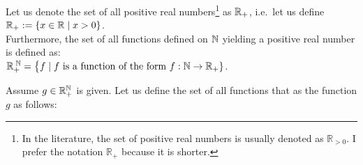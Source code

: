 Let us denote the set of all positive real numbers\footnote{
  In the literature, the set of positive real numbers is usually denoted as $\mathbb{R}_{>0}$.  I prefer the
  notation $\mathbb{R_+}$ because it is shorter.
}
as ${\mathbb R}_+$, i.e.~let us define 
\\[0.2cm]
\hspace*{1.3cm}
${\mathbb R}_+ := \{ x \in {\mathbb R} \mid x > 0 \}$. 
\\[0.2cm]
Furthermore, the set of all functions defined on  ${\mathbb N}$ yielding a positive real number is defined
as: 
\\[0.2cm]
\hspace*{1.3cm} 
${\mathbb R}_+^{\;{\mathbb N}} = \bigl\{ f \mid \mbox{$f$ is a function of the form $f: {\mathbb N} \rightarrow {\mathbb R}_+$} \}$.

\begin{Definition}[$\Oh(g)$] 
Assume $g \in {\mathbb R}_+^{{\mathbb N}}$ is given.   Let us define the set of all functions that 
  as the function $g$ as follows:
  \\[0.2cm]
  \hspace*{0.5cm} 
  \colorbox{red}{}
  \eox
\end{Definition}

